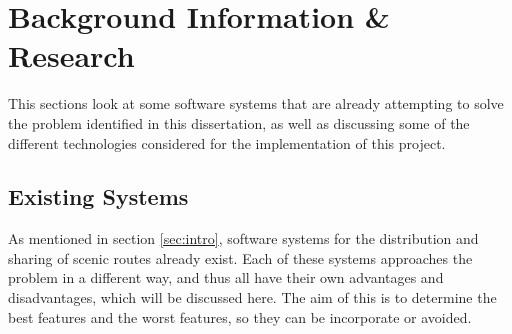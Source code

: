 \section{Background Information \& Research}
This sections look at some software systems that are already attempting to solve the problem identified in this dissertation, as well as discussing some of the different technologies considered for the implementation of this project.

\subsection{Existing Systems}
\label{sec:existing-systems}
As mentioned in section \ref{sec:intro}, software systems for the distribution and sharing of scenic routes already exist. Each of these systems approaches the problem in a different way, and thus all have their own advantages and disadvantages, which will be discussed here. The aim of this is to determine the best features and the worst features, so they can be incorporate or avoided.

